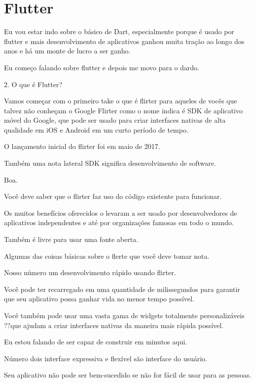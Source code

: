 

\section{Flutter}




Eu vou estar indo sobre o básico de Dart, especialmente porque é usado por flutter e mais desenvolvimento de aplicativos ganhou muita tração ao longo dos anos e há um monte de lucro a ser ganho.


Eu começo falando sobre flutter e depois me movo para o dardo.



2. O que é Flutter?

Vamos começar com o primeiro take o que é flirter para aqueles de vocês que talvez não conheçam o Google Flirter como o nome indica é SDK de aplicativo móvel do Google, que pode ser usado para criar interfaces nativas de alta qualidade em iOS e Android em um curto período de tempo.

O lançamento inicial do flirter foi em maio de 2017.

Também uma nota lateral SDK significa desenvolvimento de software.

Boa.

Você deve saber que o flirter faz uso do código existente para funcionar.

Os muitos benefícios oferecidos o levaram a ser usado por desenvolvedores de aplicativos independentes e até por organizações famosas em todo o mundo.

Também é livre para usar uma fonte aberta.

Algumas das coisas básicas sobre o flerte que você deve tomar nota.

Nosso número um desenvolvimento rápido usando flirter.

Você pode ter recarregado em uma quantidade de milissegundos para garantir que seu aplicativo possa ganhar vida no menor tempo possível.

Você também pode usar uma vasta gama de widgets totalmente personalizáveis ??que ajudam a criar interfaces nativas da maneira mais rápida possível.

Eu estou falando de ser capaz de construir em minutos aqui.

Número dois interface expressiva e flexível são interface do usuário.

Seu aplicativo não pode ser bem-sucedido se não for fácil de usar para as pessoas.

